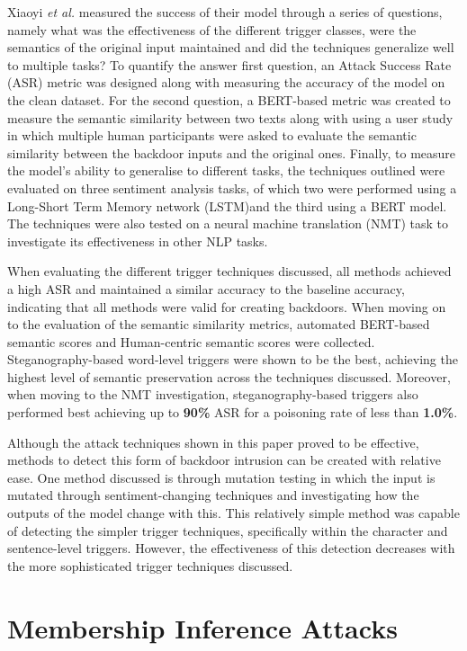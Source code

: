 Xiaoyi \textit{et al.} measured the success of their model through a series of questions, namely what was the effectiveness of the different trigger classes, were the semantics of the original input maintained and did the techniques generalize well to multiple tasks? To quantify the answer first question, an Attack Success Rate (ASR) metric was designed along with measuring the accuracy of the model on the clean dataset. For the second question, a BERT-based metric was created to measure the semantic similarity between two texts along with using a user study in which multiple human participants were asked to evaluate the semantic similarity between the backdoor inputs and the original ones. Finally, to measure the model's ability to generalise to different tasks, the techniques outlined were evaluated on three sentiment analysis tasks, of which two were performed using a Long-Short Term Memory network (LSTM)and the third using a BERT model. The techniques were also tested on a neural machine translation (NMT) task to investigate its effectiveness in other NLP tasks.

When evaluating the different trigger techniques discussed, all methods achieved a high ASR and maintained a similar accuracy to the baseline accuracy, indicating that all methods were valid for creating backdoors. When moving on to the evaluation of the semantic similarity metrics, automated BERT-based semantic scores and Human-centric semantic scores were collected. Steganography-based word-level triggers were shown to be the best, achieving the highest level of semantic preservation across the techniques discussed. Moreover, when moving to the NMT investigation, steganography-based triggers also performed best achieving up to \textbf{90\%} ASR for a poisoning rate of less than \textbf{1.0\%}.

Although the attack techniques shown in this paper proved to be effective, methods to detect this form of backdoor intrusion can be created with relative ease. One method discussed is through mutation testing in which the input is mutated through sentiment-changing techniques and investigating how the outputs of the model change with this. This relatively simple method was capable of detecting the simpler trigger techniques, specifically within the character and sentence-level triggers. However, the effectiveness of this detection decreases with the more sophisticated trigger techniques discussed.

\section{Membership Inference Attacks}

